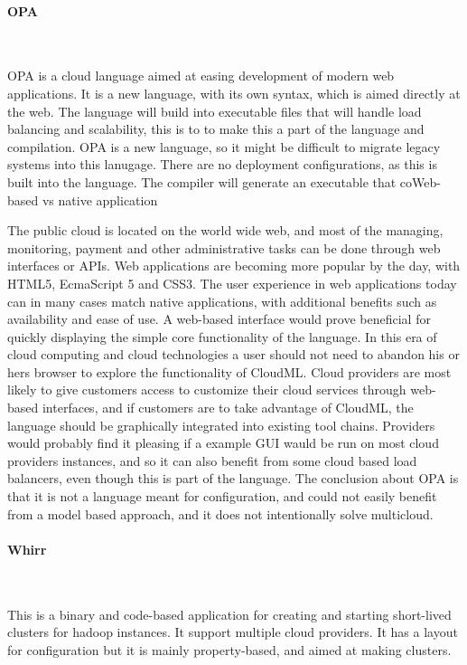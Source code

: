 \paragraph{OPA}~\cite{opa}

OPA is a cloud language aimed at easing development of modern web applications. It is a new language, 
with its own syntax, which is aimed directly at the web. The language will build into executable files that will handle load balancing and scalability, 
this is to to make this a part of the language and compilation.
OPA is a new language, so it might be difficult to migrate legacy systems into this lanugage. 
There are no deployment configurations, as this is built into the language. The compiler will generate an executable that coWeb-based vs native application

The public cloud is located on the world wide web, and most of the managing, monitoring, 
payment and other administrative tasks can be done through web interfaces or APIs. 
Web applications are becoming more popular by the day, with HTML5, EcmaScript 5 and CSS3. 
The user experience in web applications today can in many cases match native applications, with additional benefits such as availability and ease of use.
A web-based interface would prove beneficial for quickly displaying the simple core functionality of the language. 
In this era of cloud computing and cloud technologies a user should not need to abandon his or hers browser to explore the functionality of CloudML.
Cloud providers are most likely to give customers access to customize their cloud services through web-based interfaces, 
and if customers are to take advantage of CloudML, the language should be graphically integrated into existing tool chains. 
Providers would probably find it pleasing if a example GUI wauld be run on most cloud providers instances, 
and so it can also benefit from some cloud based load balancers, even though this is part of the language. 
The conclusion about OPA is that it is not a language meant for configuration, and could not easily benefit from a model based approach, 
and it does not intentionally solve multicloud.

\paragraph{Whirr}~\cite{whirr}

This is a binary and code-based application for creating and starting short-lived clusters for hadoop instances.
It support multiple cloud providers. It has a layout for configuration but it is mainly property-based, and aimed at making clusters. 

